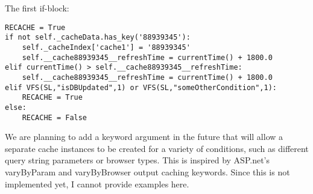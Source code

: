 The first if-block:
\begin{verbatim}
RECACHE = True
if not self._cacheData.has_key('88939345'):
    self._cacheIndex['cache1'] = '88939345'
    self.__cache88939345__refreshTime = currentTime() + 1800.0
elif currentTime() > self.__cache88939345__refreshTime:
    self.__cache88939345__refreshTime = currentTime() + 1800.0
elif VFS(SL,"isDBUpdated",1) or VFS(SL,"someOtherCondition",1):
    RECACHE = True
else:
    RECACHE = False
\end{verbatim}

We are planning to add a  keyword argument in the future that
will allow a separate cache instances to be created for a variety of conditions,
such as different query string parameters or browser types. This is inspired by
ASP.net's varyByParam and varyByBrowser output caching keywords.  Since this is
not implemented yet, I cannot provide examples here.

